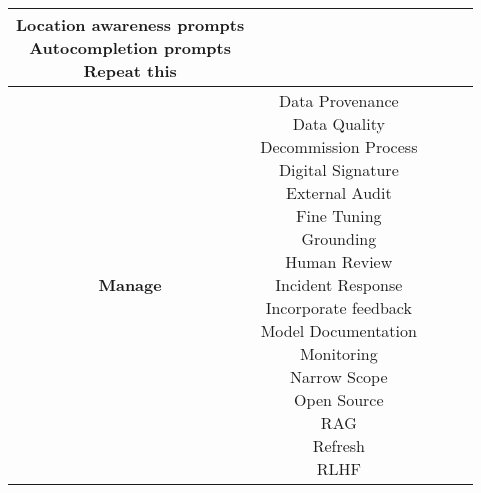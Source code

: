 \documentclass[fleqn]{article}
\begin{document}
\begin{landscape}
\begin{table}[H]
\begin{tabular}{|c|c|c|c|c|}
{			\textbullet\hspace{3pt} Location awareness prompts\\  	
			\textbullet\hspace{3pt} Autocompletion prompts\\  	
			\textbullet\hspace{3pt} Repeat this 	\\
		}
		\\
		\hline		
		\textbf{Manage} &  \makecell[l]{
			\textbullet\hspace{3pt} Data Provenance\\ 	
			\textbullet\hspace{3pt} Data Quality\\ 	
			\textbullet\hspace{3pt} Decommission Process\\ 	
			\textbullet\hspace{3pt} Digital Signature\\ 	
			\textbullet\hspace{3pt} External Audit\\ 	
			\textbullet\hspace{3pt} Fine Tuning\\ 	
			\textbullet\hspace{3pt} Grounding\\ 	
			\textbullet\hspace{3pt} Human Review \\ 	
			\textbullet\hspace{3pt} Incident Response\\ 	
			\textbullet\hspace{3pt} Incorporate feedback \\ 	
			\textbullet\hspace{3pt} Model Documentation \\ 	
			\textbullet\hspace{3pt} Monitoring\\ 
			\textbullet\hspace{3pt} Narrow Scope\\ 
		 	\textbullet\hspace{3pt} Open Source\\ 		
			\textbullet\hspace{3pt} RAG\\ 	
			\textbullet\hspace{3pt} Refresh\\ 	
			\textbullet\hspace{3pt} RLHF\\ 	
}
\end{tabular}
\end{table}
\end{landscape}
\end{document}
